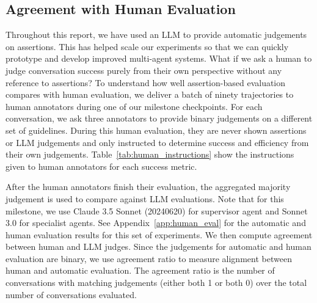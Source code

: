 \subsection{Agreement with Human Evaluation}




Throughout this report, we have used an LLM to provide automatic judgements on assertions. This has helped scale our experiments so that we can quickly prototype and develop improved multi-agent systems. What if we ask a human to judge conversation success purely from their own perspective without any reference to assertions? To understand how well assertion-based evaluation compares with human evaluation, we deliver a batch of ninety trajectories to human annotators during one of our milestone checkpoints. For each conversation, we ask three annotators to provide binary judgements on a different set of guidelines. During this human evaluation, they are never shown assertions or LLM judgements and only instructed to determine success and efficiency from their own judgements. Table~\ref{tab:human_instructions} show the instructions given to human annotators for each success metric.

After the human annotators finish their evaluation, the aggregated majority judgement is used to compare against LLM evaluations. Note that for this milestone, we use Claude 3.5 Sonnet (20240620) for supervisor agent and Sonnet 3.0 for specialist agents.  See Appendix~\ref{app:human_eval} for the automatic and human evaluation results for this set of experiments.  We then compute agreement between human and LLM judges. Since the judgements for automatic and human evaluation are binary, we use agreement ratio to measure alignment between human and automatic evaluation. The agreement ratio is the number of conversations with matching judgements (either both 1 or both 0) over the total number of conversations evaluated. 

